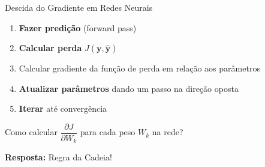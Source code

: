 \documentclass[xcolor=dvipsnames,t,aspectratio=169]{beamer}
\newcommand{\highlight}[1]{{\color{nes_dark_orange} #1}}
\begin{document}
\begin{frame}[c]{Descida do Gradiente em Redes Neurais}
    \begin{display}
        \begin{enumerate}
            \item \textbf{Fazer predição} (forward pass)
            \item \textbf{Calcular perda} $J(\mathbf{y}, \hat{\mathbf{y}})$
            \item \highlight{Calcular gradiente} da função de perda em relação aos parâmetros
            \item \textbf{Atualizar parâmetros} dando um passo na direção oposta
            \item \textbf{Iterar} até convergência
        \end{enumerate}
    \end{display}
    
    \begin{attention}
        Como calcular $\dfrac{\partial J}{\partial W_k}$ para cada peso $W_k$ na rede?
    \end{attention}
    
    \begin{center}
        \textbf{Resposta:} \highlight{Regra da Cadeia!}
    \end{center}
\end{frame}
\end{document}
